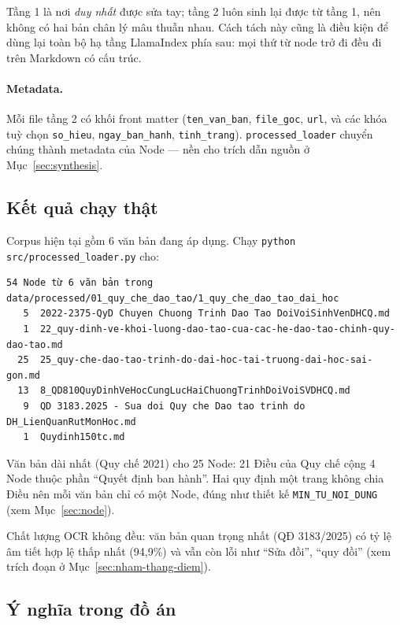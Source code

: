 Tầng 1 là nơi \emph{duy nhất} được sửa tay; tầng 2 luôn sinh lại được từ tầng 1, nên không có
hai bản chân lý mâu thuẫn nhau. Cách tách này cũng là điều kiện để dùng lại toàn bộ hạ tầng
LlamaIndex phía sau: mọi thứ từ node trở đi đều đi trên Markdown có cấu trúc.


\paragraph{Metadata.} Mỗi file tầng 2 có khối front matter (\texttt{ten\_van\_ban}, \texttt{file\_goc},
\texttt{url}, và các khóa tuỳ chọn \texttt{so\_hieu}, \texttt{ngay\_ban\_hanh}, \texttt{tinh\_trang}).
\texttt{processed\_loader} chuyển chúng thành metadata của Node --- nền cho trích dẫn nguồn ở Mục~\ref{sec:synthesis}.

\subsection{Kết quả chạy thật}
\label{sec:ingestion-ket-qua}

Corpus hiện tại gồm 6 văn bản đang áp dụng. Chạy \texttt{python src/processed\_loader.py} cho:

\begin{lstlisting}[caption={Số Node theo từng văn bản (sinh lại được bằng \texttt{make test}).}, label={lst:node-theo-van-ban}]
54 Node từ 6 văn bản trong data/processed/01_quy_che_dao_tao/1_quy_che_dao_tao_dai_hoc
   5  2022-2375-QyD Chuyen Chuong Trinh Dao Tao DoiVoiSinhVenDHCQ.md
   1  22_quy-dinh-ve-khoi-luong-dao-tao-cua-cac-he-dao-tao-chinh-quy-dao-tao.md
  25  25_quy-che-dao-tao-trinh-do-dai-hoc-tai-truong-dai-hoc-sai-gon.md
  13  8_QD810QuyDinhVeHocCungLucHaiChuongTrinhDoiVoiSVDHCQ.md
   9  QD 3183.2025 - Sua doi Quy che Dao tao trinh do DH_LienQuanRutMonHoc.md
   1  Quydinh150tc.md
\end{lstlisting}

Văn bản dài nhất (Quy chế 2021) cho 25 Node: 21 Điều của Quy chế cộng 4 Node thuộc phần
``Quyết định ban hành''. Hai quy định một trang không chia Điều nên mỗi văn bản chỉ có một Node,
đúng như thiết kế \texttt{MIN\_TU\_NOI\_DUNG} (xem Mục~\ref{sec:node}).


Chất lượng OCR không đều: văn bản quan trọng nhất (QĐ 3183/2025) có tỷ lệ âm tiết hợp lệ thấp nhất
(94,9\%) và vẫn còn lỗi như ``Sửa đồi'', ``quy đồi'' (xem trích đoạn ở Mục~\ref{sec:nham-thang-diem}).

\subsection{Ý nghĩa trong đồ án}

